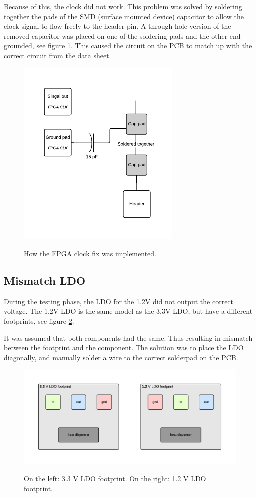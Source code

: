\documentclass[../main/report.tex]{subfiles}
\begin{document}
Because of this, the clock did not work.
This problem was solved by soldering together the pads of the SMD (surface mounted device) capacitor to allow the clock signal to flow freely to the header pin.
A through-hole version of the removed capacitor was placed on one of the soldering pads and the other end grounded, see figure \ref{fig:pcb-clock-fix}.
This caused the circuit on the PCB to match up with the correct circuit from the data sheet.

\begin{figure}[H]
    \centering
    \includegraphics[width=0.7\textwidth]{../pcb/assets/pcb-clock-fix.pdf}
    \label{fig:pcb-clock-fix}
    \caption{How the FPGA clock fix was implemented.}
\end{figure}

\subsection{Mismatch LDO}
During the testing phase, the LDO for the 1.2V did not output the correct voltage.
The 1.2V LDO is the same model as the 3.3V LDO, but have a different
footprints, see figure \ref{fig:ldo-footprints}.

It was assumed that both components had the same.
Thus resulting in mismatch between the footprint and the component.
The solution was to place the LDO diagonally,  and manually solder a wire to the correct solderpad on the PCB. 

\begin{figure}[H]
    \centering
    \includegraphics[width=\textwidth]{../pcb/assets/ldo-footprints.pdf}
    \label{fig:ldo-footprints}
    \caption{On the left: 3.3 V LDO footprint. On the right: 1.2 V LDO footprint.}
\end{figure}
\end{document}
